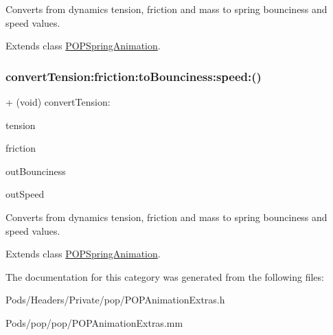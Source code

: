 Converts from dynamics tension, friction and mass to spring bounciness and speed values. 

Extends class \mbox{\hyperlink{interface_p_o_p_spring_animation_a6b5d0ffdb16b10c6de3575d9d45b831b}{P\+O\+P\+Spring\+Animation}}.

\mbox{\label{category_p_o_p_spring_animation_07_p_o_p_animation_extras_08_a6b5d0ffdb16b10c6de3575d9d45b831b}} 
\subsubsection{\texorpdfstring{convert\+Tension\+:friction\+:to\+Bounciness\+:speed\+:()}{convertTension:friction:toBounciness:speed:()}\hspace{0.1cm}{\footnotesize\ttfamily [3/3]}}
{\footnotesize\ttfamily + (void) convert\+Tension\+: \begin{DoxyParamCaption}\item[{(C\+G\+Float)}]{tension }\item[{friction:(C\+G\+Float)}]{friction }\item[{toBounciness:(C\+G\+Float $\ast$)}]{out\+Bounciness }\item[{speed:(C\+G\+Float $\ast$)}]{out\+Speed }\end{DoxyParamCaption}}

Converts from dynamics tension, friction and mass to spring bounciness and speed values. 

Extends class \mbox{\hyperlink{interface_p_o_p_spring_animation_a6b5d0ffdb16b10c6de3575d9d45b831b}{P\+O\+P\+Spring\+Animation}}.



The documentation for this category was generated from the following files\+:\begin{DoxyCompactItemize}
\item 
Pods/\+Headers/\+Private/pop/P\+O\+P\+Animation\+Extras.\+h\item 
Pods/pop/pop/P\+O\+P\+Animation\+Extras.\+mm\end{DoxyCompactItemize}
